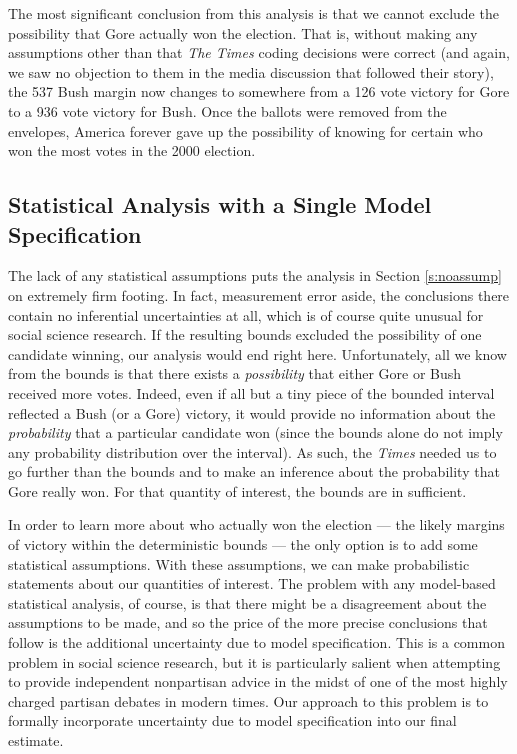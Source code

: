 \documentclass[11pt,titlepage]{article}
\begin{document}
The most significant conclusion from this analysis is that we cannot
exclude the possibility that Gore actually won the election.  That is,
without making any assumptions other than that \emph{The Times} coding
decisions were correct (and again, we saw no objection to them in the
media discussion that followed their story), the 537 Bush margin now
changes to somewhere from a 126 vote victory for Gore to a 936 vote
victory for Bush.  Once the ballots were removed from the envelopes,
America forever gave up the possibility of knowing for certain who won
the most votes in the 2000 election.

\subsection{Statistical Analysis with a Single Model Specification}
\label{s:onemodel} 

The lack of any statistical assumptions puts the analysis in Section
\ref{s:noassump} on extremely firm footing.  In fact, measurement
error aside, the conclusions there contain no inferential
uncertainties at all, which is of course quite unusual for social
science research.  If the resulting bounds excluded the possibility of
one candidate winning, our analysis would end right here.
Unfortunately, all we know from the bounds is that there exists a
\emph{possibility} that either Gore or Bush received more votes.
Indeed, even if all but a tiny piece of the bounded interval reflected
a Bush (or a Gore) victory, it would provide no information about the
\emph{probability} that a particular candidate won (since the bounds
alone do not imply any probability distribution over the interval).
As such, the \emph{Times} needed us to go further than the bounds and
to make an inference about the probability that Gore really won.  For
that quantity of interest, the bounds are in sufficient.

In order to learn more about who actually won the election --- the
likely margins of victory within the deterministic bounds --- the only
option is to add some statistical assumptions.  With these
assumptions, we can make probabilistic statements about our quantities
of interest.  The problem with any model-based statistical analysis,
of course, is that there might be a disagreement about the assumptions
to be made, and so the price of the more precise conclusions that
follow is the additional uncertainty due to model specification.  This
is a common problem in social science research, but it is particularly
salient when attempting to provide independent nonpartisan advice in
the midst of one of the most highly charged partisan debates in modern
times.  Our approach to this problem is to formally incorporate
uncertainty due to model specification into our final estimate.
\end{document}

